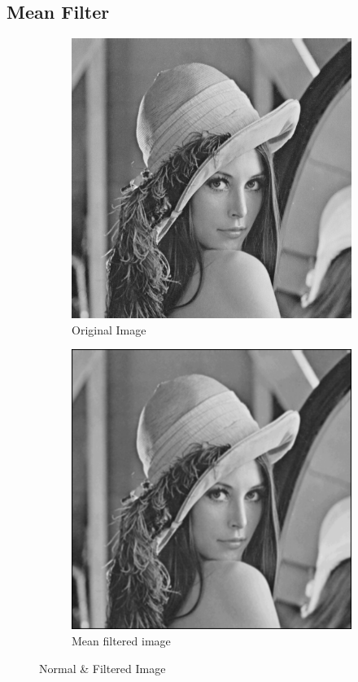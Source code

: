 \documentclass[a4paper,16pt]{article}
\begin{document}
	\subsection{Mean Filter}
	
	\begin{figure}[b!]
		\begin{subfigure}[h]{0.45\linewidth}
			\includegraphics[width=\linewidth]{grayscale}
			\caption{Original Image}
		\end{subfigure}
		\hfill
		\begin{subfigure}[h]{0.45\linewidth}
			\includegraphics[width=\linewidth]{meanfilter}
			\caption{Mean filtered image}
		\end{subfigure}%
		\caption{Normal \& Filtered Image}
	\end{figure}
	\newpage
\end{document}
